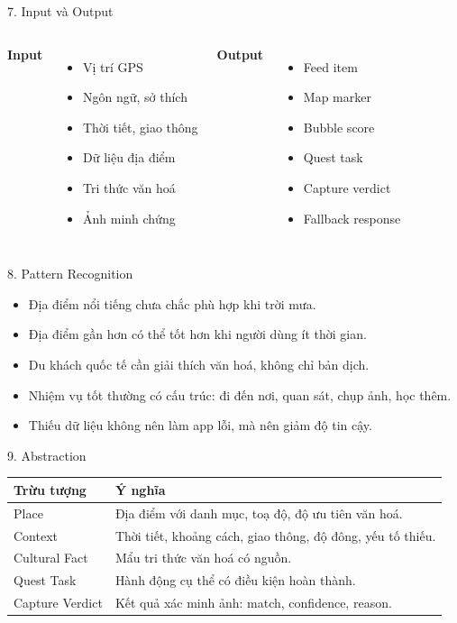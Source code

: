 \documentclass[aspectratio=169]{beamer}
\begin{document}
\begin{frame}{7. Input và Output}
\begin{columns}
\textbf{Input}
\begin{itemize}
    \item Vị trí GPS
    \item Ngôn ngữ, sở thích
    \item Thời tiết, giao thông
    \item Dữ liệu địa điểm
    \item Tri thức văn hoá
    \item Ảnh minh chứng
\end{itemize}
\textbf{Output}
\begin{itemize}
    \item Feed item
    \item Map marker
    \item Bubble score
    \item Quest task
    \item Capture verdict
    \item Fallback response
\end{itemize}
\end{columns}
\end{frame}

\begin{frame}{8. Pattern Recognition}
\begin{itemize}
    \item Địa điểm nổi tiếng chưa chắc phù hợp khi trời mưa.
    \item Địa điểm gần hơn có thể tốt hơn khi người dùng ít thời gian.
    \item Du khách quốc tế cần giải thích văn hoá, không chỉ bản dịch.
    \item Nhiệm vụ tốt thường có cấu trúc: đi đến nơi, quan sát, chụp ảnh, học thêm.
    \item Thiếu dữ liệu không nên làm app lỗi, mà nên giảm độ tin cậy.
\end{itemize}
\end{frame}

\begin{frame}{9. Abstraction}
\begin{tabularx}{\textwidth}{lX}
\toprule
\textbf{Trừu tượng} & \textbf{Ý nghĩa}\\
\midrule
Place & Địa điểm với danh mục, toạ độ, độ ưu tiên văn hoá.\\
Context & Thời tiết, khoảng cách, giao thông, độ đông, yếu tố thiếu.\\
Cultural Fact & Mẩu tri thức văn hoá có nguồn.\\
Quest Task & Hành động cụ thể có điều kiện hoàn thành.\\
Capture Verdict & Kết quả xác minh ảnh: match, confidence, reason.\\
\bottomrule
\end{tabularx}
\end{frame}
\end{document}
